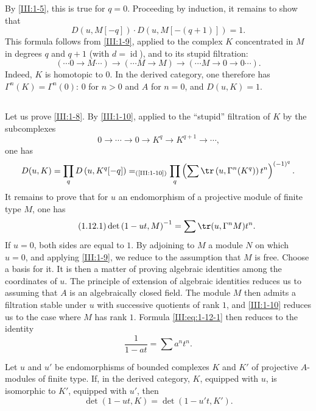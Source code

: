 \documentclass[oneside]{book}
\begin{document}
By \ref{III:1-5}, this is true for $q=0$. Proceeding by induction, it remains
to show that
\[
  D\left(u,M[-q]\right) \cdot D\left(u,M[-(q+1)]\right) = 1 \text{.}
\]
This formula follows from \ref{III:1-9}, applied to the complex $K$
concentrated in $M$ in degrees $q$ and $q+1$ (with
$d=\operatorname{id}$), and to its stupid filtration:
\[
  (\cdots 0 \to M \cdots) \to (\cdots M \to M) \to (\cdots M \to 0 \to 0 \cdots) \text{.}
\]
Indeed, $K$ is homotopic to $0$. In the derived category, one therefore has
$\Gamma^n(K)=\Gamma^n(0)$: $0$ for $n>0$ and $A$ for $n=0$, and $D(u,K)=1$.





\subsection{}\label{III:1-12}

Let us prove \ref{III:1-8}. By \ref{III:1-10}, applied to the ``stupid''
filtration of $K$ by the subcomplexes
\[
  0 \to \cdots \to 0 \to K^q \to K^{q+1} \to \cdots \text{,}
\]
one has
\[
  D(u,K) = \prod_q D\left(u,K^q[-q]\right) =_{\text{(\ref{III:1-10})}} \prod_q \left(\sum \tr\left(u,\Gamma^n(K^q)\right) t^n \right)^{(-1)^q} \text{.}
\]
It remains to prove that for $u$ an endomorphism of a projective module of
finite type $M$, one has
\begin{equation*}\tag{1.12.1}\label{III:eq:1-12-1}
  \det\left(1-u t,M\right)^{-1} = \sum \tr(u,\Gamma^n M) t^n \text{.}
\end{equation*}
If $u=0$, both sides are equal to $1$. By adjoining to $M$ a module $N$ on
which $u=0$, and applying \ref{III:1-9}, we reduce to the assumption that $M$
is free. Choose a basis for it. It is then a matter of proving algebraic
identities among the coordinates of $u$. The principle of extension of
algebraic identities reduces us to assuming that $A$ is an algebraically
closed field. The module $M$ then admits a filtration stable under $u$ with
successive quotients of rank $1$, and \ref{III:1-10} reduces us to the case
where $M$ has rank $1$. Formula \eqref{III:eq:1-12-1} then reduces to the
identity
\[
  \frac{1}{1-a t} = \sum a^n t^n \text{.}
\]





\begin{corollary_}\label{III:1-13}
Let $u$ and $u'$ be endomorphisms of bounded complexes $K$ and $K'$ of
projective $A$-modules of finite type. If, in the derived category, $K$,
equipped with $u$, is isomorphic to $K'$, equipped with $u'$, then
\[
  \det(1-u t,K) = \det(1-u' t,K') \text{.}
\]
\end{corollary_}
\end{document}
